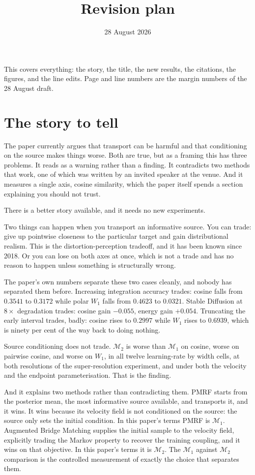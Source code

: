 \documentclass[11pt]{article}
\title{Revision plan}
\author{}
\date{28 August 2026}
\newcommand{\M}{\mathcal M}
\begin{document}
\maketitle

This covers everything: the story, the title, the new results, the citations, the figures, and
the line edits. Page and line numbers are the margin numbers of the 28 August draft.

\section{The story to tell}

The paper currently argues that transport can be harmful and that conditioning on the source
makes things worse. Both are true, but as a framing this has three problems. It reads as a
warning rather than a finding. It contradicts two methods that work, one of which was written by
an invited speaker at the venue. And it measures a single axis, cosine similarity, which the
paper itself spends a section explaining you should not trust.

There is a better story available, and it needs no new experiments.

Two things can happen when you transport an informative source. You can trade: give up pointwise
closeness to the particular target and gain distributional realism. This is the
distortion-perception tradeoff, and it has been known since 2018. Or you can lose on both axes at
once, which is not a trade and has no reason to happen unless something is structurally wrong.

The paper's own numbers separate these two cases cleanly, and nobody has separated them before.
Increasing integration accuracy trades: cosine falls from $0.3541$ to $0.3172$ while polar $W_1$
falls from $0.4623$ to $0.0321$. Stable Diffusion at $8\times$ degradation trades: cosine gain
$-0.055$, energy gain $+0.054$. Truncating the early interval trades, badly: cosine rises to
$0.2997$ while $W_1$ rises to $0.6939$, which is ninety per cent of the way back to doing nothing.

Source conditioning does not trade. $\M_2$ is worse than $\M_1$ on cosine, worse on pairwise
cosine, and worse on $W_1$, in all twelve learning-rate by width cells, at both resolutions of
the super-resolution experiment, and under both the velocity and the endpoint parameterisation.
That is the finding.

And it explains two methods rather than contradicting them. PMRF starts from the posterior mean,
the most informative source available, and transports it, and it wins. It wins because its
velocity field is not conditioned on the source: the source only sets the initial condition. In
this paper's terms PMRF is $\M_1$. Augmented Bridge Matching supplies the initial sample to the
velocity field, explicitly trading the Markov property to recover the training coupling, and it
wins on that objective. In this paper's terms it is $\M_2$. The $\M_1$ against $\M_2$ comparison
is the controlled measurement of exactly the choice that separates them.
\end{document}

